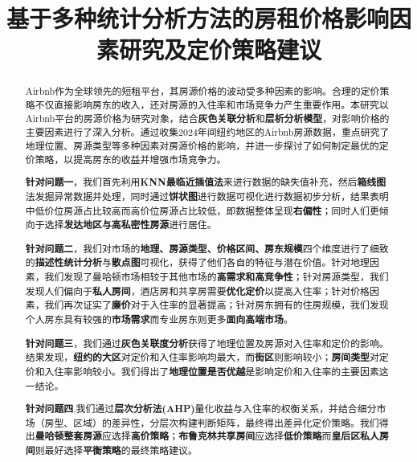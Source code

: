 \documentclass[12pt]{article}
\title{ \textbf{基于多种统计分析方法的房租价格影响因素研究及定价策略建议}}
\date{}
\begin{document}
\begin{CJK}{UTF8}{gbsn}
	
	\thispagestyle{fancy}
	
	
\setlength{\droptitle}{-3cm}
	\thispagestyle{fancy}
	\maketitle  %
	
	\setcounter{page}{1}
	
	\vspace{-7em}
	\begin{abstract}  %
		\vspace{1em}
		Airbnb作为全球领先的短租平台，其房源价格的波动受多种因素的影响。合理的定价策略不仅直接影响房东的收入，还对房源的入住率和市场竞争力产生重要作用。本研究以Airbnb平台的房源价格为研究对象，结合\textbf{灰色关联分析}和\textbf{层析分析模型}，对影响价格的主要因素进行了深入分析。通过收集2024年间纽约地区的Airbnb房源数据，重点研究了地理位置、房源类型等多种因素对房源价格的影响，并进一步探讨了如何制定最优的定价策略，以提高房东的收益并增强市场竞争力。
		
		\textbf{针对问题一}，我们首先利用\textbf{KNN最临近插值法}来进行数据的缺失值补充，然后\textbf{箱线图}法发掘异常数据并处理，同时通过\textbf{饼状图}进行数据可视化进行数据初步分析，结果表明中低价位房源占比较高而高价位房源占比较低，即数据整体呈现\textbf{右偏性}；同时人们更倾向于选择\textbf{发达地区与高私密性房源}进行居住。
		
		\textbf{针对问题二}，我们对市场的\textbf{地理、房源类型、价格区间、房东规模}四个维度进行了细致的\textbf{描述性统计分析}与\textbf{散点图}可视化，获得了他们各自的特征与潜在价值。针对地理因素，我们发现了曼哈顿市场相较于其他市场的\textbf{高需求和高竞争性}；针对房源类型，我们发现人们偏向于\textbf{私人房间}，酒店房和共享房需要\textbf{优化定价}以提高入住率；针对价格因素，我们再次证实了\textbf{廉价}对于入住率的显著提高；针对房东拥有的住房规模，我们发现个人房东具有较强的\textbf{市场需求}而专业房东则更多\textbf{面向高端市场}。
		
		\textbf{针对问题三}，我们通过\textbf{灰色关联度分析}获得了地理位置及房源对入住率和定价的影响。结果发现，\textbf{纽约的大区}对定价和入住率影响均最大，而\textbf{街区}则影响较小；\textbf{房间类型}对定价和入住率影响较小。我们得出了\textbf{地理位置是否优越}是影响定价和入住率的主要因素这一结论。
		
		\textbf{针对问题四},我们通过\textbf{层次分析法(AHP)}量化收益与入住率的权衡关系，并结合细分市场（房型、区域）的差异性，分层次构建判断矩阵，最终得出差异化定价策略。我们得出\textbf{曼哈顿整套房源}应选择\textbf{高价策略}；\textbf{布鲁克林共享房间}应选择\textbf{低价策略}而\textbf{皇后区私人房间}则最好选择\textbf{平衡策略}的最终策略建议。\\
		

\end{abstract}
\end{CJK}
\end{document}
